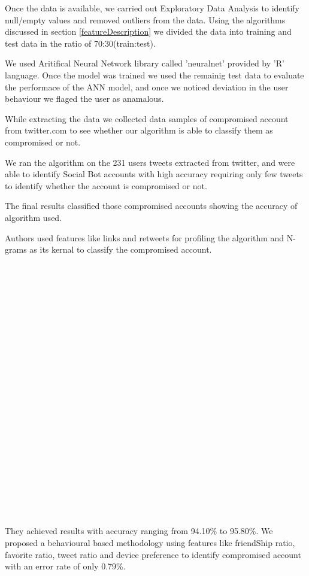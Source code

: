 \documentclass[conference]{IEEEtran}
\begin{document}
	  Once the data is available, we carried out Exploratory Data Analysis to identify null/empty values and removed outliers from the data. 
	  Using the algorithms discussed in section \ref{featureDescription} we divided the data into training and test data in the ratio of 70:30(train:test).

	  We used Aritifical Neural Network library called 'neuralnet' provided by 'R' language. 
	  Once the model was trained we used the remainig test data to evaluate the performace of the ANN model, 
	  and once we noticed deviation in the user behaviour we flaged the user as anamalous.
	
	  While extracting the data we collected data samples of compromised account from twitter.com to see 
	  whether our algorithm is able to classify them as compromised or not. 
	  
	  We ran the algorithm on the 231 users tweets extracted from twitter, and were able to identify Social Bot accounts 
	  with high accuracy requiring only few tweets to identify whether the account is compromised or not.
	 
	  The final results classified those compromised accounts showing the accuracy of algorithm used.
	  
	  Authors\cite{12} used features like links and retweets for profiling the algorithm and N-grams as its kernal to classify the compromised account.\\\\\\\\\\\\\\\\\\\\\\\\\\\\\\\\\\\\\\\\\\\\\\\\
	   They achieved results with accuracy ranging  from 94.10\% to 95.80\%. We proposed a behavioural based methodology using features like friendShip ratio, favorite
	  ratio, tweet ratio and device preference to identify compromised account with an error rate of only 0.79\%.
 
\end{document}
